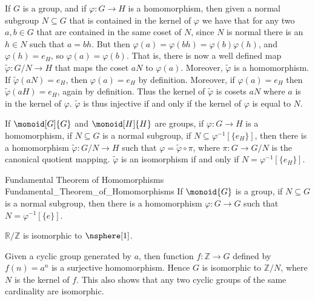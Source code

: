 \documentclass{book}                                                           %
\begin{document}
            If $G$ is a group, and if $\varphi:G\rightarrow{H}$ is a
            homomorphism, then given a normal subgroup $N\subseteq{G}$ that
            is contained in the kernel of $\varphi$ we have that for any two
            $a,b\in{G}$ that are contained in the same coset of $N$, since
            $N$ is normal there is an $h\in{N}$ such that $a=bh$. But then
            $\varphi(a)=\varphi(bh)=\varphi(b)\varphi(h)$, and
            $\varphi(h)=e_{H}$, so $\varphi(a)=\varphi(b)$. That is, there
            is now a well defined map $\tilde{\varphi}:G/N\rightarrow{H}$
            that maps the coset $aN$ to $\varphi(a)$. Moreover,
            $\tilde{\varphi}$ is a homomorphism. If
            $\tilde{\varphi}(aN)=e_{H}$, then $\varphi(a)=e_{H}$ by
            definition. Moreover, if $\varphi(a)=e_{H}$ then
            $\tilde{\varphi}(aH)=e_{H}$, again by definition. Thus the
            kernel of $\tilde{\varphi}$ is cosets $aN$ where $a$ is in the
            kernel of $\varphi$. $\tilde{\varphi}$ is thus injective if and
            only if the kernel of $\varphi$ is equal to $N$.
            \begin{theorem}
                If $\monoid[G]{G}$ and $\monoid[H]{H}$ are groups, if
                $\varphi:G\rightarrow{H}$ is a homomorphism, if
                $N\subseteq{G}$ is a normal subgroup, if
                $N\subseteq\varphi^{\minus{1}}[\{e_{H}\}]$, then there is a
                homomorphism $\tilde{\varphi}:G/N\rightarrow{H}$ such that
                $\varphi=\tilde{\varphi}\circ\pi$, where
                $\pi:G\rightarrow{G}/N$ is the canonical quotient mapping.
                $\tilde{\varphi}$ is an isomorphism if and only if
                $N=\varphi^{\minus{1}}[\{e_{H}\}]$.
            \end{theorem}
            \begin{ftheorem}{Fundamental Theorem of Homomorphisms}
                            {Fundamental_Theorem_of_Homomorphisms}
                If $\monoid{G}$ is a group, if $N\subseteq{G}$ is a normal
                subgroup, then there is a homomorphism
                $\varphi:G\rightarrow{G}$ such that
                $N=\varphi^{\minus{1}}[\{e\}]$.
            \end{ftheorem}
            \begin{example}
                $\mathbb{R}/\mathbb{Z}$ is isomorphic to $\nsphere[1]$.
            \end{example}
            \begin{example}
                Given a cyclic group generated by $a$, then function
                $f:\mathbb{Z}\rightarrow{G}$ defined by $f(n)=a^{n}$ is a
                surjective homomorphism. Hence $G$ is isomorphic to
                $\mathbb{Z}/N$, where $N$ is the kernel of $f$. This also
                shows that any two cyclic groups of the same cardinality
                are isomorphic.
            \end{example}
\end{document}
